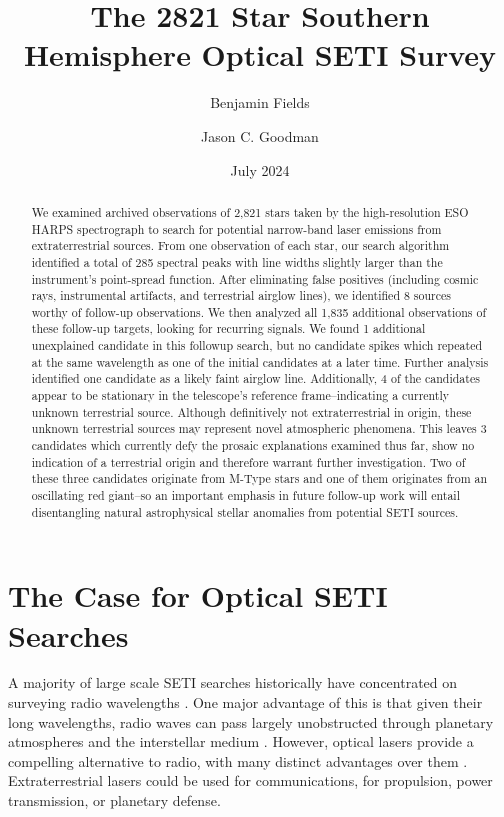 \documentclass[linenumbers]{aastex631}
\begin{document}
\title{The 2821 Star Southern Hemisphere Optical SETI Survey}
\author[0009-0008-7048-916X]{Benjamin Fields} %
\author[0000-0002-6755-2710]{Jason C. Goodman}

\date{July 2024}

\begin{abstract}
We examined archived observations of 2,821 stars taken by the high-resolution ESO HARPS spectrograph to search for potential narrow-band laser emissions from extraterrestrial sources. From one observation of each star, our search algorithm identified a total of 285 spectral peaks with line widths slightly larger than the instrument's point-spread function.  After eliminating  false positives (including cosmic rays, instrumental artifacts, and terrestrial airglow lines), we identified 8 sources worthy of follow-up observations. We then analyzed all 1,835 additional observations of these follow-up targets, looking for recurring signals. We found 1 additional unexplained candidate in this followup search, but no candidate spikes which repeated at the same wavelength as one of the initial candidates at a later time.  Further analysis identified one candidate as a likely faint airglow line. Additionally, 4 of the candidates appear to be stationary in the telescope's reference frame--indicating a currently unknown terrestrial source. Although definitively not extraterrestrial in origin, these unknown terrestrial sources may represent novel atmospheric phenomena. This leaves 3 candidates which currently defy the prosaic explanations examined thus far, show no indication of a terrestrial origin and therefore warrant further investigation. Two of these three candidates originate from M-Type stars and one of them originates from an oscillating red giant--so an important emphasis in future follow-up work will entail disentangling natural astrophysical stellar anomalies from potential SETI sources.
\end{abstract}

\section{The Case for Optical SETI Searches}
A majority of large scale SETI searches historically have concentrated on surveying radio wavelengths \citep{Gray_2017,OZMAII,LAMPTON1992189,Price_2020,PeterMa,Wright_2018}. One major advantage of this is that given their long wavelengths, radio waves can pass largely unobstructed through planetary atmospheres and the interstellar medium \citep{COCCONI_MORRISON_1959}. However, optical lasers provide a compelling alternative to radio, with many distinct advantages over them \citep{caseforopticalseti}. Extraterrestrial lasers could be used for communications, for propulsion, power transmission, or planetary defense.  
\end{document}

